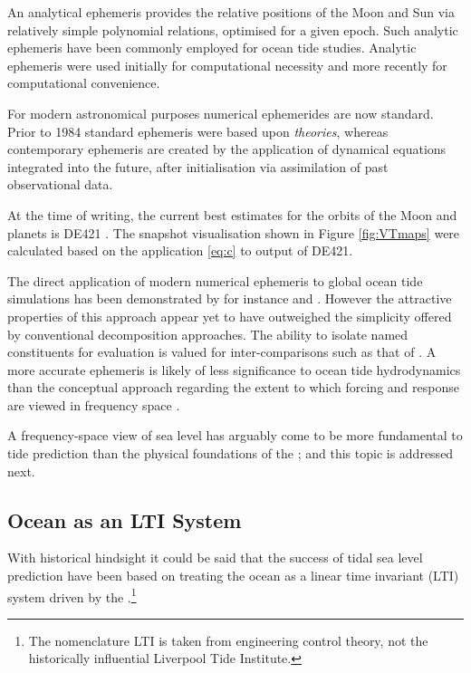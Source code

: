 An analytical ephemeris provides the relative positions of the Moon and Sun via relatively simple polynomial relations, optimised for a given epoch.  Such analytic ephemeris have been commonly employed for ocean tide studies.   Analytic ephemeris were used initially for computational necessity and more recently for computational convenience.


For modern astronomical purposes numerical ephemerides are now standard.  Prior to 1984 standard ephemeris were based upon \emph{theories}\citep[sec 8.1]{Urban:2013vl}, whereas contemporary ephemeris are created by the application of dynamical equations integrated into the future, after initialisation via assimilation of past observational data.

At the time of writing, the current best estimates for the orbits of the Moon and planets is DE421 \citep{Folkner:2008wm}.   The snapshot visualisation shown in Figure \ref{fig:VTmaps} were calculated based on the application \ref{eq:c} to output of DE421.


The direct application of modern numerical ephemeris to global ocean tide simulations has been demonstrated by for instance \citep{Weis:2008ex} and \citep{10.1007/s10236-016-1016-1}.
However the attractive properties of this approach appear yet to have outweighed the simplicity offered by conventional decomposition approaches.   The ability to isolate named constituents for evaluation is valued for inter-comparisons such as that of \citet{Stammer:2014vh}.
A more accurate ephemeris is likely of less significance to ocean tide hydrodynamics than the conceptual approach regarding the extent to which forcing and response are viewed in frequency space \citep{10.17125/gov2018.ch13}.

A frequency-space view of sea level has arguably come to be more fundamental to tide prediction than the physical foundations of the \ATGP{}; and this topic is addressed next.

\subsection{Ocean as an LTI System}
\label{sec:LTI}
With historical hindsight it could be said that the success of tidal sea level prediction have been based on treating the ocean as a linear time invariant (LTI) system driven by the \ATGP{}.\footnote{The nomenclature LTI is taken from engineering control theory, not the historically influential Liverpool Tide Institute.}

